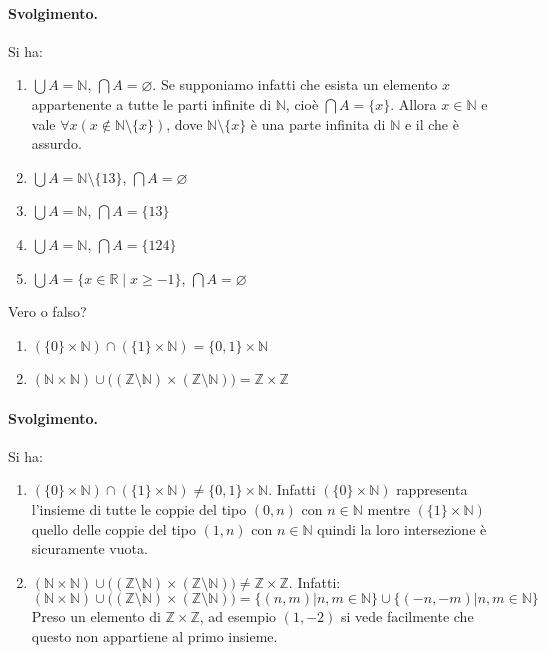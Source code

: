 \paragraph{Svolgimento.} Si ha:
\begin{enumerate}
	\item $\bigcup A = \mathbb{N}$, $\bigcap A = \varnothing$. 	Se supponiamo infatti che esista un elemento $x$ appartenente a tutte le parti infinite di $\mathbb{N}$, cioè $\bigcap A = \{x\}$. Allora $x \in \mathbb{N}$ e vale $\forall x( x \notin \mathbb{N}\setminus\{x\})$, dove $\mathbb{N}\setminus\{x\}$ è una parte infinita di $\mathbb{N}$ e il che è assurdo.
	\item $\bigcup A = \mathbb{N}\setminus \{13\}$,	$\bigcap A = \varnothing$
	\item 	$\bigcup A = \mathbb{N}$, $\bigcap A = \{13\}$
	\item 	$\bigcup A = \mathbb{N}$, $\bigcap A = \{124\}$
	\item $\bigcup A = \{x \in \mathbb{R} \; | \; x \geq -1 \} $, $\bigcap A = \varnothing$
\end{enumerate}
\hfill \blacksquare
\begin{exsbox}
	Vero o falso?
	\begin{enumerate}
		\item $(\{0\} \times \mathbb{N}) \cap (\{1\} \times \mathbb{N}) = \{0,1\} \times \mathbb{N}$
		\item $(\mathbb{N} \times \mathbb{N}) \cup \bigl((\mathbb{Z}\setminus \mathbb{N})\times (\mathbb{Z} \setminus \mathbb{N})\bigr)= \mathbb{Z} \times \mathbb{Z}$
	\end{enumerate}
\end{exsbox}
\paragraph{Svolgimento.} 	Si ha:
\begin{enumerate}
	\item $(\{0\}\times \mathbb{N})\cap (\{1\}\times \mathbb{N}) \neq \{0,1\}\times \mathbb{N}$. Infatti $(\{0\}\times \mathbb{N})$ rappresenta l'insieme di tutte le coppie del tipo $(0,n)$ con $n \in \mathbb{N}$ mentre $(\{1\}\times \mathbb{N})$ quello delle coppie del tipo $(1,n)$ con $n \in \mathbb{N}$ quindi la loro intersezione è sicuramente vuota.
	\item $(\mathbb{N}\times \mathbb{N})\cup \bigl((\mathbb{Z} \setminus \mathbb{N}) \times (\mathbb{Z} \setminus \mathbb{N})\bigr) \neq \mathbb{Z} \times \mathbb{Z}$. Infatti:
	\begin{displaymath}
		(\mathbb{N}\times \mathbb{N})\cup \bigl((\mathbb{Z} \setminus \mathbb{N}) \times (\mathbb{Z} \setminus \mathbb{N})\bigr) =	\{(n,m)| n,m \in \mathbb{N}\} \cup \{(-n,-m) | n,m \in \mathbb{N} \}
	\end{displaymath}
	Preso un elemento di $\mathbb{Z} \times \mathbb{Z}$, ad esempio $(1,-2)$ si vede facilmente che questo non appartiene al primo insieme. \hfill \blacksquare
\end{enumerate}

